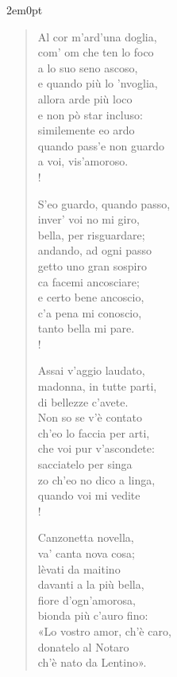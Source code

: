 \begin{adjustwidth}{2em}{0pt}
\begin{verse}
Al cor m’ard’una doglia, \label{m28} \\
com’ om che ten lo foco \label{m29} \\
a lo suo seno ascoso, \label{m30} \\
e quando più lo ’nvoglia, \label{m31} \\
allora arde più loco \label{m32} \\
e non pò star incluso: \label{m33} \\
similemente eo ardo \label{m34} \\
quando pass’e non guardo \label{m35} \\
a voi, vis’amoroso. \label{m36} \\!

S’eo guardo, quando passo, \label{m37} \\
inver’ voi no mi giro, \label{m38} \\
bella, per risguardare; \label{m39} \\
andando, ad ogni passo \label{m40} \\
getto uno gran sospiro \label{m41} \\
ca facemi ancosciare; \label{m42} \\
e certo bene ancoscio, \label{m43} \\
c’a pena mi conoscio, \label{m44} \\
tanto bella mi pare. \label{m45} \\!

Assai v’aggio laudato, \label{m46} \\
madonna, in tutte parti, \label{m47} \\
di bellezze c’avete. \label{m48} \\
Non so se v’è contato \label{m49} \\
ch’eo lo faccia per arti, \label{m50} \\
che voi pur v’ascondete: \label{m51} \\
sacciatelo per singa \label{m52} \\
zo ch’eo no dico a linga, \label{m53} \\
quando voi mi vedite \label{m54} \\!

Canzonetta novella, \label{m55} \\
va’ canta nova cosa; \label{m56} \\
lèvati da maitino \label{m57} \\
davanti a la più bella, \label{m58} \\
fiore d’ogn’amorosa, \label{m59} \\
bionda più c’auro fino: \label{m60} \\
«Lo vostro amor, ch’è caro, \label{m61} \\
donatelo al Notaro \label{m62} \\
ch’è nato da Lentino». \label{m63}
\end{verse}
\end{adjustwidth}

